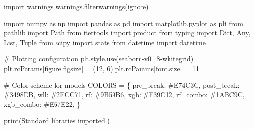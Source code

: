 \documentclass[
  letterpaper,
  DIV=11,
  numbers=noendperiod]{scrartcl}
\newenvironment{Shaded}{\begin{snugshade}}{\end{snugshade}}
\newcommand{\BuiltInTok}[1]{\textcolor[rgb]{0.00,0.23,0.31}{#1}}
\newcommand{\CommentTok}[1]{\textcolor[rgb]{0.37,0.37,0.37}{#1}}
\newcommand{\DecValTok}[1]{\textcolor[rgb]{0.68,0.00,0.00}{#1}}
\newcommand{\ImportTok}[1]{\textcolor[rgb]{0.00,0.46,0.62}{#1}}
\newcommand{\NormalTok}[1]{\textcolor[rgb]{0.00,0.23,0.31}{#1}}
\newcommand{\OperatorTok}[1]{\textcolor[rgb]{0.37,0.37,0.37}{#1}}
\newcommand{\StringTok}[1]{\textcolor[rgb]{0.13,0.47,0.30}{#1}}
\begin{document}
\begin{Shaded}
\begin{Highlighting}[]
\ImportTok{import}\NormalTok{ warnings}
\NormalTok{warnings.filterwarnings(}\StringTok{\textquotesingle{}ignore\textquotesingle{}}\NormalTok{)}

\ImportTok{import}\NormalTok{ numpy }\ImportTok{as}\NormalTok{ np}
\ImportTok{import}\NormalTok{ pandas }\ImportTok{as}\NormalTok{ pd}
\ImportTok{import}\NormalTok{ matplotlib.pyplot }\ImportTok{as}\NormalTok{ plt}
\ImportTok{from}\NormalTok{ pathlib }\ImportTok{import}\NormalTok{ Path}
\ImportTok{from}\NormalTok{ itertools }\ImportTok{import}\NormalTok{ product}
\ImportTok{from}\NormalTok{ typing }\ImportTok{import}\NormalTok{ Dict, Any, List, Tuple}
\ImportTok{from}\NormalTok{ scipy }\ImportTok{import}\NormalTok{ stats}
\ImportTok{from}\NormalTok{ datetime }\ImportTok{import}\NormalTok{ datetime}

\CommentTok{\# Plotting configuration}
\NormalTok{plt.style.use(}\StringTok{\textquotesingle{}seaborn{-}v0\_8{-}whitegrid\textquotesingle{}}\NormalTok{)}
\NormalTok{plt.rcParams[}\StringTok{\textquotesingle{}figure.figsize\textquotesingle{}}\NormalTok{] }\OperatorTok{=}\NormalTok{ (}\DecValTok{12}\NormalTok{, }\DecValTok{6}\NormalTok{)}
\NormalTok{plt.rcParams[}\StringTok{\textquotesingle{}font.size\textquotesingle{}}\NormalTok{] }\OperatorTok{=} \DecValTok{11}

\CommentTok{\# Color scheme for models}
\NormalTok{COLORS }\OperatorTok{=}\NormalTok{ \{}
    \StringTok{\textquotesingle{}pre\_break\textquotesingle{}}\NormalTok{: }\StringTok{\textquotesingle{}\#E74C3C\textquotesingle{}}\NormalTok{,}
    \StringTok{\textquotesingle{}post\_break\textquotesingle{}}\NormalTok{: }\StringTok{\textquotesingle{}\#3498DB\textquotesingle{}}\NormalTok{,}
    \StringTok{\textquotesingle{}wll\textquotesingle{}}\NormalTok{: }\StringTok{\textquotesingle{}\#2ECC71\textquotesingle{}}\NormalTok{,}
    \StringTok{\textquotesingle{}rf\textquotesingle{}}\NormalTok{: }\StringTok{\textquotesingle{}\#9B59B6\textquotesingle{}}\NormalTok{,}
    \StringTok{\textquotesingle{}xgb\textquotesingle{}}\NormalTok{: }\StringTok{\textquotesingle{}\#F39C12\textquotesingle{}}\NormalTok{,}
    \StringTok{\textquotesingle{}rf\_combo\textquotesingle{}}\NormalTok{: }\StringTok{\textquotesingle{}\#1ABC9C\textquotesingle{}}\NormalTok{,}
    \StringTok{\textquotesingle{}xgb\_combo\textquotesingle{}}\NormalTok{: }\StringTok{\textquotesingle{}\#E67E22\textquotesingle{}}\NormalTok{,}
\NormalTok{\}}

\BuiltInTok{print}\NormalTok{(}\StringTok{\textquotesingle{}Standard libraries imported.\textquotesingle{}}\NormalTok{)}
\end{Highlighting}
\end{Shaded}
\end{document}

